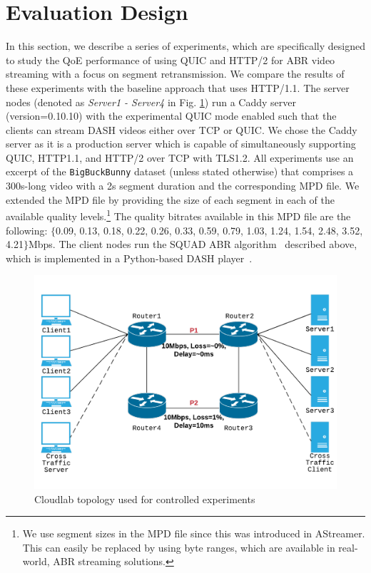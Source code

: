 \section{Evaluation Design}
\label{sec:eval}
In this section, we describe a series of experiments, which are specifically designed to study the QoE performance of using QUIC and HTTP/2 for ABR video streaming with a focus on segment retransmission. We compare the results of these experiments  with the baseline approach that uses HTTP/1.1. The server nodes (denoted as \textit{Server1 - Server4} in Fig. \ref{fig:clab_topo}) run a Caddy server (version=0.10.10) \cite{caddy} with the experimental QUIC mode enabled such that the clients can stream DASH videos either over TCP or QUIC. We chose the Caddy server as it is a production server which is capable of simultaneously supporting QUIC, HTTP1.1, and HTTP/2 over TCP with TLS1.2. All experiments use an excerpt of the \texttt{BigBuckBunny} dataset \cite{lederer2012dynamic} (unless stated otherwise) that comprises a 300s-long video with a 2s segment duration and the corresponding MPD file. We extended the MPD file by providing the size of each segment in each of the available quality levels.\footnote{We use segment sizes in the MPD file since this was introduced in AStreamer. This can easily be replaced by using byte ranges, which are available in real-world, ABR streaming solutions.} The quality bitrates available in this MPD file are the following: $\{${0.09, 0.13, 0.18, 0.22, 0.26, 0.33, 0.59, 0.79, 1.03, 1.24, 1.54, 2.48, 3.52, 4.21}$\}$Mbps. The client nodes run the SQUAD ABR algorithm~\cite{Wang:TOMM:2017} described above, which is implemented in a Python-based DASH player~\cite{parikshit:icc}.

\begin{figure}
\centering
\includegraphics[width=\linewidth,angle=0,scale=0.85, trim={2cm 2cm 2cm 2cm}]{figures/ACM_MM18_topo_v2.pdf}
\caption{Cloudlab topology used for controlled experiments}
\label{fig:clab_topo}
\vspace{-20pt}
\end{figure}

